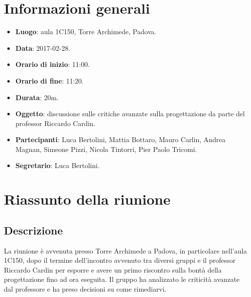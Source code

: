 \documentclass[a4paper,titlepage]{article}
\begin{document}
\maketitle
\begin{diario}
\end{diario}
\newpage
\tableofcontents

\newpage
\section{Informazioni generali}
\label{sec:Informazioni}

\begin{itemize}
  \item \textbf{Luogo}: aula 1C150, Torre Archimede, Padova.
  \item \textbf{Data}: 2017-02-28.
  \item \textbf{Orario di inizio}: 11:00.
  \item \textbf{Orario di fine}: 11:20.
  \item \textbf{Durata}: 20m.
  \item \textbf{Oggetto}: discussione sulle critiche avanzate sulla progettazione da parte del professor Riccardo Cardin.
  \item \textbf{Partecipanti}: Luca Bertolini, Mattia Bottaro, Mauro Carlin, Andrea Magnan, Simeone Pizzi, Nicola Tintorri, Pier Paolo Tricomi.
  \item \textbf{Segretario}: Luca Bertolini.

\end{itemize}
\section{Riassunto della riunione}
\label{sec:RiassuntoRiunione}
 \subsection{Descrizione}
La riunione è avvenuta presso Torre Archimede a Padova, in particolare nell'aula 1C150, dopo il termine dell'incontro avvenuto tra diversi gruppi e il professor Riccardo Cardin per esporre e avere un primo riscontro sulla bontà della progettazione fino ad ora eseguita. Il gruppo \GRUPPO{} ha analizzato le criticità avanzate dal professore e ha preso decisioni su come rimediarvi.
\end{document}
